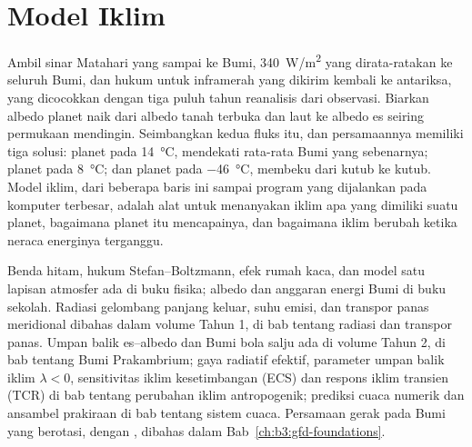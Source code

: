 \chapter{Model Iklim}\label{ch:b3:climate-models}

Ambil sinar Matahari yang sampai ke Bumi, \qty{340}{W/m^2} yang dirata-ratakan
ke seluruh Bumi, dan hukum untuk inframerah yang dikirim kembali ke antariksa, yang dicocokkan dengan
tiga puluh tahun reanalisis dari observasi. Biarkan albedo planet naik dari albedo
tanah terbuka dan laut ke albedo es seiring permukaan mendingin. Seimbangkan kedua
fluks itu, dan persamaannya memiliki tiga solusi: planet pada
\qty{14}{\celsius}, mendekati rata-rata Bumi yang sebenarnya; planet pada
\qty{8}{\celsius}; dan planet pada \qty{-46}{\celsius}, membeku dari
kutub ke kutub. Model iklim, dari beberapa baris ini sampai program yang
dijalankan pada komputer terbesar, adalah alat untuk menanyakan iklim apa yang dimiliki suatu planet, bagaimana planet itu mencapainya,
dan bagaimana iklim berubah ketika neraca energinya terganggu.

\begin{recall}
Benda hitam, hukum Stefan--Boltzmann, efek rumah kaca, dan
model satu lapisan atmosfer ada di buku fisika; albedo dan
anggaran energi Bumi di buku sekolah. Radiasi gelombang panjang keluar,
suhu emisi, dan transpor panas meridional dibahas dalam
volume Tahun 1, di bab tentang radiasi dan transpor panas. Umpan balik es--albedo dan
Bumi bola salju ada di volume Tahun 2, di
bab tentang Bumi Prakambrium; gaya radiatif efektif, parameter
umpan balik iklim $\lambda < 0$, sensitivitas iklim kesetimbangan
(ECS) dan respons iklim transien (TCR) di bab
tentang perubahan iklim antropogenik; prediksi cuaca numerik dan
ansambel prakiraan di bab tentang sistem cuaca. Persamaan
gerak pada Bumi yang berotasi, dengan , dibahas dalam
Bab~\ref{ch:b3:gfd-foundations}.
\end{recall}


